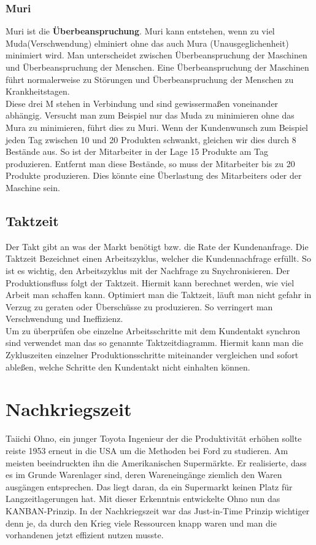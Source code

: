 \documentclass[00_ToyotaProduktionssystem.tex]{subfiles}
\begin{document}
\subsubsection{Muri}
Muri ist die \textbf{Überbeanspruchung}. Muri kann entstehen, wenn zu viel Muda(Verschwendung) elminiert ohne das auch Mura (Unausgeglichenheit) minimiert wird. Man unterscheidet zwischen Überbeanspruchung der Maschinen und Überbeanspruchung der Menschen. Eine Überbeanspruchung der Maschinen führt normalerweise zu Störungen und Überbeanspruchung der Menschen zu Krankheitstagen. \\ Diese drei M stehen in Verbindung und sind gewissermaßen voneinander abhängig. Versucht man zum Beispiel nur das Muda zu minimieren ohne das Mura zu minimieren, führt dies zu Muri. Wenn der Kundenwunsch zum Beispiel jeden Tag zwischen 10 und 20 Produkten schwankt, gleichen wir dies durch 8 Bestände aus. So ist der Mitarbeiter in der Lage 15 Produkte am Tag produzieren. Entfernt man diese Bestände, so muss der Mitarbeiter bis zu 20 Produkte produzieren. Dies könnte eine Überlastung des Mitarbeiters oder der Maschine sein.

\subsection{Taktzeit}
Der Takt gibt an was der Markt benötigt bzw. die Rate der Kundenanfrage. Die Taktzeit Bezeichnet einen Arbeitszyklus, welcher die Kundennachfrage erfüllt. So ist es wichtig, den Arbeitszyklus mit der Nachfrage zu Snychronisieren. Der Produktionsfluss folgt der Taktzeit. Hiermit kann berechnet werden, wie viel Arbeit man schaffen kann. Optimiert man die Taktzeit, läuft man nicht gefahr in Verzug zu geraten oder Überschüsse zu produzieren. So verringert man Verschwendung und Ineffizienz.
\\
Um zu überprüfen obe einzelne Arbeitsschritte mit dem Kundentakt synchron sind verwendet man das so genannte Taktzeitdiagramm. Hiermit kann man die Zykluszeiten einzelner Produktionsschritte miteinander vergleichen und sofort ableßen, welche Schritte den Kundentakt nicht einhalten können.


\section{Nachkriegszeit}
Taiichi Ohno, ein junger Toyota Ingenieur der die Produktivität erhöhen sollte reiste 1953 erneut in die USA um die Methoden bei Ford zu studieren. Am meisten beeindruckten ihn die Amerikanischen Supermärkte. Er realisierte, dass es im Grunde Warenlager sind, deren Wareneingänge ziemlich den Waren ausgängen entsprechen. Das liegt daran, da ein Supermarkt keinen Platz für Langzeitlagerungen hat. Mit dieser Erkenntnis entwickelte Ohno nun das KANBAN-Prinzip. In der Nachkriegszeit war das Just-in-Time Prinzip wichtiger denn je, da durch den Krieg viele Ressourcen knapp waren und man die vorhandenen jetzt effizient nutzen musste.
\end{document}
